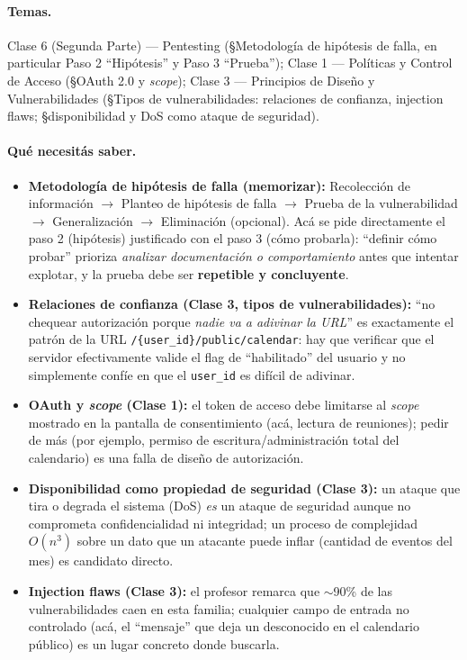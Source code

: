 \paragraph{Temas.}
Clase 6 (Segunda Parte) --- Pentesting (\S Metodología de hipótesis de falla, en
particular Paso 2 ``Hipótesis'' y Paso 3 ``Prueba''); Clase 1 --- Políticas y Control de
Acceso (\S OAuth 2.0 y \emph{scope}); Clase 3 --- Principios de Diseño y Vulnerabilidades
(\S Tipos de vulnerabilidades: relaciones de confianza, injection flaws; \S disponibilidad
y DoS como ataque de seguridad).

\paragraph{Qué necesitás saber.}
\begin{itemize}
  \item \textbf{Metodología de hipótesis de falla (memorizar):} Recolección de información
  $\to$ Planteo de hipótesis de falla $\to$ Prueba de la vulnerabilidad $\to$
  Generalización $\to$ Eliminación (opcional). Acá se pide directamente el paso 2
  (hipótesis) justificado con el paso 3 (cómo probarla): ``definir cómo probar'' prioriza
  \emph{analizar documentación o comportamiento} antes que intentar explotar, y la prueba
  debe ser \textbf{repetible y concluyente}.
  \item \textbf{Relaciones de confianza (Clase 3, tipos de vulnerabilidades):} ``no
  chequear autorización porque \emph{nadie va a adivinar la URL}'' es exactamente el
  patrón de la URL \texttt{/\{user\_id\}/public/calendar}: hay que verificar que el
  servidor efectivamente valide el flag de ``habilitado'' del usuario y no simplemente
  confíe en que el \texttt{user\_id} es difícil de adivinar.
  \item \textbf{OAuth y \emph{scope} (Clase 1):} el token de acceso debe limitarse al
  \emph{scope} mostrado en la pantalla de consentimiento (acá, lectura de reuniones);
  pedir de más (por ejemplo, permiso de escritura/administración total del calendario) es
  una falla de diseño de autorización.
  \item \textbf{Disponibilidad como propiedad de seguridad (Clase 3):} un ataque que tira
  o degrada el sistema (DoS) \emph{es} un ataque de seguridad aunque no comprometa
  confidencialidad ni integridad; un proceso de complejidad $O(n^3)$ sobre un dato que un
  atacante puede inflar (cantidad de eventos del mes) es candidato directo.
  \item \textbf{Injection flaws (Clase 3):} el profesor remarca que $\sim$90\% de las
  vulnerabilidades caen en esta familia; cualquier campo de entrada no controlado (acá, el
  ``mensaje'' que deja un desconocido en el calendario público) es un lugar concreto donde
  buscarla.
\end{itemize}


